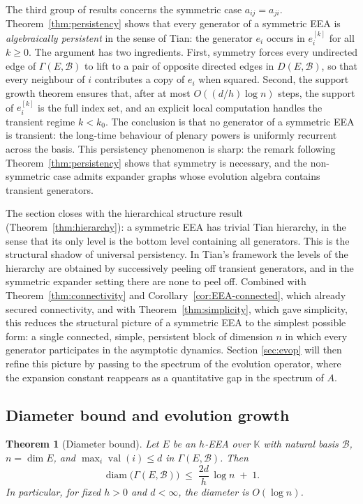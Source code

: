 \documentclass[12pt,a4paper]{amsart}
\newtheorem{theorem}{Theorem}[section]
\theoremstyle{definition}
\DeclareMathOperator{\val}{val}
\DeclareMathOperator{\diam}{diam}
\newcommand{\K}{\mathbb{K}}
\newcommand{\EA}{E}          %
\newcommand{\natbasis}{\mathcal{B}}  %
\newcommand{\strmat}{A}      %
\begin{document}
\medskip
The third group of results concerns the symmetric case
$a_{ij}=a_{ji}$.  Theorem~\ref{thm:persistency} shows that every
generator of a symmetric EEA is \emph{algebraically persistent} in the
sense of Tian: the generator $e_i$ occurs in $e_i^{[k]}$ for all
$k\ge 0$.  The argument has two ingredients.  First, symmetry forces
every undirected edge of $\varGamma(\EA,\natbasis)$ to lift to a pair
of opposite directed edges in $D(\EA,\natbasis)$, so that every
neighbour of $i$ contributes a copy of $e_i$ when squared.  Second,
the support growth theorem ensures that, after at most $O((d/h)\log
n)$ steps, the support of $e_i^{[k]}$ is the full index set, and an
explicit local computation handles the transient regime $k<k_0$.  The
conclusion is that no generator of a symmetric EEA is transient: the
long-time behaviour of plenary powers is uniformly recurrent across
the basis.  This persistency phenomenon is sharp: the remark following
Theorem~\ref{thm:persistency} shows that symmetry is necessary, and
the non-symmetric case admits expander graphs whose evolution algebra
contains transient generators.

\medskip
The section closes with the hierarchical structure result
(Theorem~\ref{thm:hierarchy}): a symmetric EEA has trivial Tian
hierarchy, in the sense that its only level is the bottom level
containing all generators.  This is the structural shadow of universal
persistency.  In Tian's framework the levels of the hierarchy are
obtained by successively peeling off transient generators, and in the
symmetric expander setting there are none to peel off.  Combined with
Theorem~\ref{thm:connectivity} and Corollary~\ref{cor:EEA-connected},
which already secured connectivity, and with
Theorem~\ref{thm:simplicity}, which gave simplicity, this reduces the
structural picture of a symmetric EEA to the simplest possible form: a
single connected, simple, persistent block of dimension $n$ in which
every generator participates in the asymptotic dynamics.  Section
\ref{sec:evop} will then refine this picture by passing to the
spectrum of the evolution operator, where the expansion constant
reappears as a quantitative gap in the spectrum of $\strmat$.

\subsection{Diameter bound and evolution growth}

\begin{theorem}[Diameter bound]\label{thm:diameter}
Let $\EA$ be an $h$-EEA over $\K$ with natural basis $\natbasis$,
$n=\dim\EA$, and $\max_i\val(i)\le d$ in $\varGamma(\EA,\natbasis)$.
Then
\[
  \diam\!\bigl(\varGamma(\EA,\natbasis)\bigr)
  \;\le\;
  \frac{2d}{h}\,\log n \;+\; 1.
\]
In particular, for fixed $h>0$ and $d<\infty$, the diameter is
$O(\log n)$.
\end{theorem}
\end{document}
